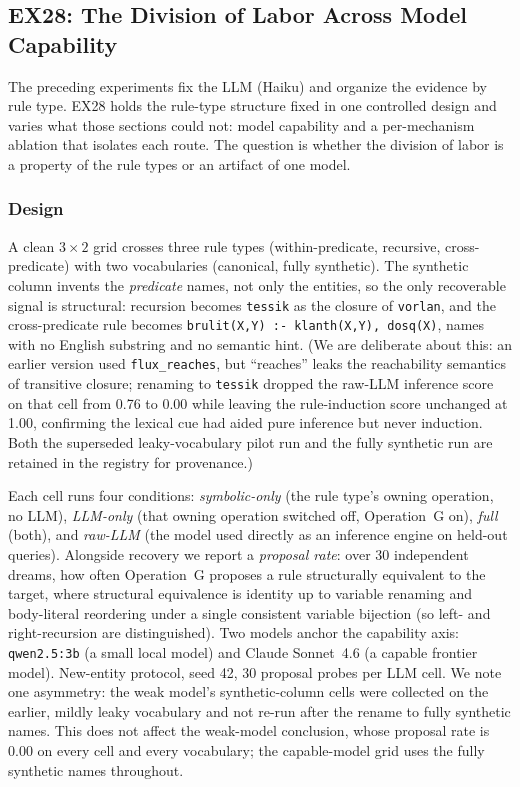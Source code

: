 \documentclass[10pt,conference]{IEEEtran}
\begin{document}
\subsection{EX28: The Division of Labor Across Model Capability}
\label{sec:ex28}

The preceding experiments fix the LLM (Haiku) and organize the evidence by rule type. EX28 holds the rule-type structure fixed in one controlled design and varies what those sections could not: model capability and a per-mechanism ablation that isolates each route. The question is whether the division of labor is a property of the rule types or an artifact of one model.

\subsubsection{Design}
A clean $3\times2$ grid crosses three rule types (within-predicate, recursive, cross-predicate) with two vocabularies (canonical, fully synthetic). The synthetic column invents the \emph{predicate} names, not only the entities, so the only recoverable signal is structural: recursion becomes \texttt{tessik} as the closure of \texttt{vorlan}, and the cross-predicate rule becomes \texttt{brulit(X,Y) :- klanth(X,Y), dosq(X)}, names with no English substring and no semantic hint. (We are deliberate about this: an earlier version used \texttt{flux\_reaches}, but ``reaches'' leaks the reachability semantics of transitive closure; renaming to \texttt{tessik} dropped the raw-LLM inference score on that cell from 0.76 to 0.00 while leaving the rule-induction score unchanged at 1.00, confirming the lexical cue had aided pure inference but never induction. Both the superseded leaky-vocabulary pilot run and the fully synthetic run are retained in the registry for provenance.)

Each cell runs four conditions: \textit{symbolic-only} (the rule type's owning operation, no LLM), \textit{LLM-only} (that owning operation switched off, Operation~G on), \textit{full} (both), and \textit{raw-LLM} (the model used directly as an inference engine on held-out queries). Alongside recovery we report a \emph{proposal rate}: over 30 independent dreams, how often Operation~G proposes a rule structurally equivalent to the target, where structural equivalence is identity up to variable renaming and body-literal reordering under a single consistent variable bijection (so left- and right-recursion are distinguished). Two models anchor the capability axis: \texttt{qwen2.5:3b} (a small local model) and Claude Sonnet~4.6 (a capable frontier model). New-entity protocol, seed 42, 30 proposal probes per LLM cell. We note one asymmetry: the weak model's synthetic-column cells were collected on the earlier, mildly leaky vocabulary and not re-run after the rename to fully synthetic names. This does not affect the weak-model conclusion, whose proposal rate is 0.00 on every cell and every vocabulary; the capable-model grid uses the fully synthetic names throughout.
\end{document}
